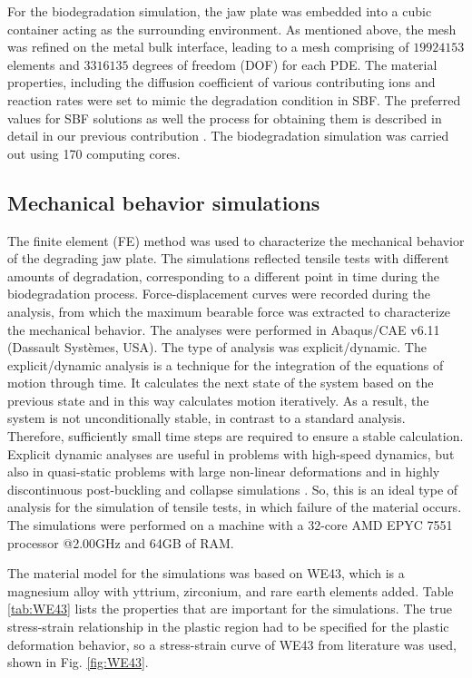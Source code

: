 For the biodegradation simulation, the jaw plate was embedded into a cubic container acting as the surrounding environment. As mentioned above, the mesh was refined on the metal bulk interface, leading to a mesh comprising of $\num{19924153}$ elements and $\num{3316135}$ degrees of freedom (\gls{DOF}) for each \gls{PDE}. The material properties, including the diffusion coefficient of various contributing ions and reaction rates were set to mimic the degradation condition in SBF. The preferred values for SBF solutions as well the process for obtaining them is described in detail in our previous contribution \cite{Barzegari2021}. The biodegradation simulation was carried out using 170 computing cores.

\subsection{Mechanical behavior simulations}
\label{sec:FEA}

The finite element (FE) method was used to characterize the mechanical behavior of the degrading jaw plate. The simulations reflected tensile tests with different amounts of degradation, corresponding to a different point in time during the biodegradation process. Force-displacement curves were recorded during the analysis, from which the maximum bearable force was extracted to characterize the mechanical behavior. The analyses were performed in Abaqus/CAE v6.11 (Dassault Systèmes, USA). The type of analysis was explicit/dynamic. The explicit/dynamic analysis is a technique for the integration of the equations of motion through time. It calculates the next state of the system based on the previous state and in this way calculates motion iteratively. As a result, the system is not unconditionally stable, in contrast to a standard analysis. Therefore, sufficiently small time steps are required to ensure a stable calculation. Explicit dynamic analyses are useful in problems with high-speed dynamics, but also in quasi-static problems with large non-linear deformations and in highly discontinuous post-buckling and collapse simulations \cite{explicit2}. So, this is an ideal type of analysis for the simulation of tensile tests, in which failure of the material occurs. The simulations were performed on a machine with a 32-core AMD EPYC 7551 processor @2.00GHz and 64GB of RAM.

The material model for the simulations was based on WE43, which is a magnesium alloy with yttrium, zirconium, and rare earth elements added. Table \ref{tab:WE43} lists the properties that are important for the simulations. The true stress-strain relationship in the plastic region had to be specified for the plastic deformation behavior, so a stress-strain curve of WE43 from literature was used, shown in Fig. \ref{fig:WE43}.

